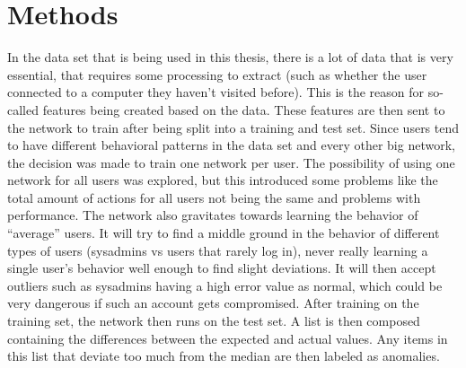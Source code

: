 \chapter{Methods}\label{ch:methods}

In the data set that is being used in this thesis, there is a lot of data that is very essential, that requires some processing to extract (such as whether the user connected to a computer they haven't visited before). This is the reason for so-called features being created based on the data. These features are then sent to the network to train after being split into a training and test set. Since users tend to have different behavioral patterns in the data set and every other big network, the decision was made to train one network per user. The possibility of using one network for all users was explored, but this introduced some problems like the total amount of actions for all users not being the same and problems with performance. The network also gravitates towards learning the behavior of \enquote{average} users. It will try to find a middle ground in the behavior of different types of users (sysadmins vs users that rarely log in), never really learning a single user's behavior well enough to find slight deviations. It will then accept outliers such as sysadmins having a high error value as normal, which could be very dangerous if such an account gets compromised. After training on the training set, the network then runs on the test set. A list is then composed containing the differences between the expected and actual values. Any items in this list that deviate too much from the median are then labeled as anomalies.


